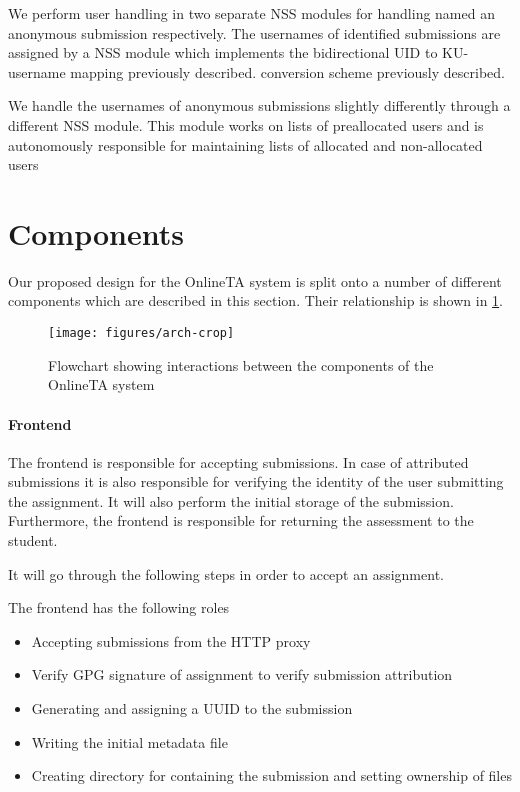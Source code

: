 We perform user handling in two separate NSS modules for handling
named an anonymous submission respectively. The usernames of
identified submissions are assigned by a NSS module which implements
the bidirectional UID to KU-username mapping previously described.
conversion scheme previously described.

We handle the usernames of anonymous submissions slightly
differently through a different NSS module. This module works on lists
of preallocated users and is autonomously responsible for maintaining
lists of allocated and non-allocated users 

\section{Components}
Our proposed design for the OnlineTA system is split onto a number of
different components which are described in this section. Their
relationship is shown in \cref{fig:arch}.

\begin{figure}
\centering
\texttt{[image: figures/arch-crop]}

\caption{Flowchart showing interactions between the components of the
  OnlineTA system}
\label{fig:arch}
\end{figure}

\paragraph{Frontend}
The frontend is responsible for accepting submissions. In case of
attributed submissions it is also responsible for verifying the
identity of the user submitting the assignment. It will also perform
the initial storage of the submission. Furthermore, the frontend is
responsible for returning the assessment to the student.

It will go through the following steps in order to accept an
assignment.

The frontend has the following roles
\begin{itemize}
\item Accepting submissions from the HTTP proxy
\item Verify GPG signature of assignment to verify submission
  attribution
\item Generating and assigning a UUID to the submission
\item Writing the initial metadata file
\item Creating directory for containing the submission and setting
  ownership of files
\end{itemize}


